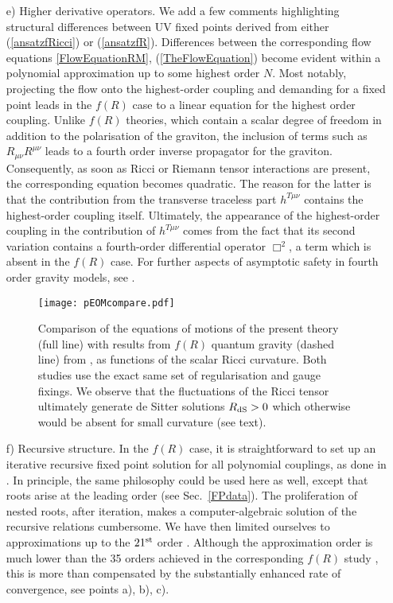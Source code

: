 \documentclass[notitlepage,eqsecnum,bm,amsmath,preprintnumbers,superscriptaddress,nofootinbib,aps,11pt]{revtex4-1}
\def\eq#1{(\ref{#1})}
\begin{document}
\begin{itemize}
\item[e)] 
Higher derivative operators. We add a few  comments highlighting structural differences between UV fixed points derived from either \eq{ansatzfRicci} or \eq{ansatzfR}. Differences between the  corresponding  flow  equations \eqref{FlowEquationRM}, \eq{TheFlowEquation}  become evident within a polynomial approximation up to some highest order $N$. Most notably, projecting the flow onto the highest-order coupling and demanding for a fixed point leads in the $f(R)$ case to a linear equation for the highest order coupling. 
Unlike $f(R)$ theories, 
which contain a scalar degree of freedom in addition to the polarisation of the  graviton, the inclusion of terms such as $R_{\mu\nu} R^{\mu\nu}$ leads to a fourth order inverse propagator for the graviton. Consequently, 
as soon as Ricci or Riemann tensor interactions are present, the corresponding equation becomes quadratic.
The reason for the latter is that
the contribution from the transverse 
traceless part $h^{T\mu\nu}$ contains the highest-order coupling itself.
Ultimately, the appearance 
of the highest-order 
coupling in the contribution of $h^{T\mu\nu}$ comes from the fact that its second variation contains a fourth-order differential operator $\Box^2$, a term which is absent in the $f(R)$ case. For further aspects of asymptotic safety in fourth order gravity models, see \cite{Benedetti:2009rx,Niedermaier:2009zz,Niedermaier:2010zz,Christiansen:2016sjn,Becker:2017tcx}.



\begin{figure*}[t]
\begin{center}
\texttt{[image: pEOMcompare.pdf]}
\caption{\label{pCompareE} Comparison of the equations of motions of the present theory (full line) with results from $f(R)$ quantum gravity (dashed line) from \cite{Falls:2016wsa}, as functions of the scalar Ricci curvature. Both studies use the exact same set of regularisation and gauge fixings. We observe that the fluctuations of the Ricci tensor ultimately generate de Sitter solutions $R_{\rm dS}>0$ which otherwise would be absent for small curvature  (see text).}
\end{center}
\end{figure*}

\item[f)] 
Recursive structure.  In the $f(R)$ case, it is straightforward to 
set up an iterative recursive fixed point solution for all polynomial couplings, as done in \cite{Falls:2013bv,Falls:2014tra}. In principle, the same philosophy could be used here as well, except that roots arise at the leading order  (see Sec.~\ref{FPdata}). The proliferation of nested roots,  after iteration, makes a computer-algebraic solution of the recursive relations  cumbersome. 
We have then limited ourselves to approximations up to the $21^{\rm st}$ order \cite{Nikolakopoulos:Thesis,King:MSc}. Although the approximation order is much lower than the  35 orders achieved in the corresponding $f(R)$ study \cite{Falls:2013bv,Falls:2014tra}, this is more than compensated by the substantially enhanced rate of convergence, see points a), b), c). 
\end{itemize}
\end{document}
